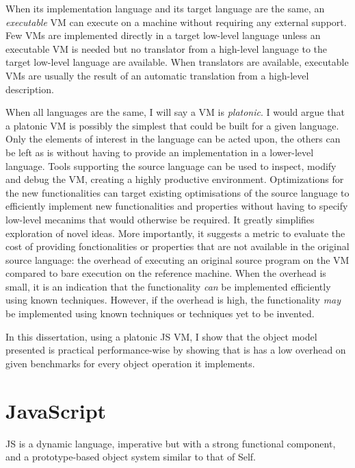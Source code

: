 When its implementation language and its target language are the same, an
\textit{executable} VM can execute on a machine without requiring any external
support. Few VMs are implemented directly in a target low-level language unless
an executable VM is needed but no translator from a high-level language to the
target low-level language are available. When translators are available,
executable VMs are usually the result of an automatic translation from a high-level
description.

When all languages are the same, I will say a VM is \textit{platonic}.  I would
argue that a platonic VM is possibly the simplest that could be built for a
given language. Only the elements of interest in the language can be acted
upon, the others can be left as is without having to provide an implementation
in a lower-level language.  Tools supporting the source language can be used to
inspect, modify and debug the VM, creating a highly productive environment.
Optimizations for the new functionalities can target existing optimisations of
the source language to efficiently implement new functionalities and properties
without having to specify low-level mecanims that would otherwise be required.
It greatly simplifies exploration of novel ideas. More importantly, it suggests
a metric to evaluate the cost of providing fonctionalities or properties that
are not available in the original source language: the overhead of executing an
original source program on the VM compared to bare execution on the reference
machine. When the overhead is small, it is an indication that the functionality
\textit{can} be implemented efficiently using known techniques. However, if the
overhead is high, the functionality \textit{may} be implemented using known
techniques or techniques yet to be invented.

In this dissertation, using a platonic JS VM, I show that the object model
presented is practical performance-wise by showing that is has a low
overhead on given benchmarks for every object operation it implements. 

\section{JavaScript}

JS is a dynamic language, imperative but with a strong functional component,
and a prototype-based object system similar to that of Self.

